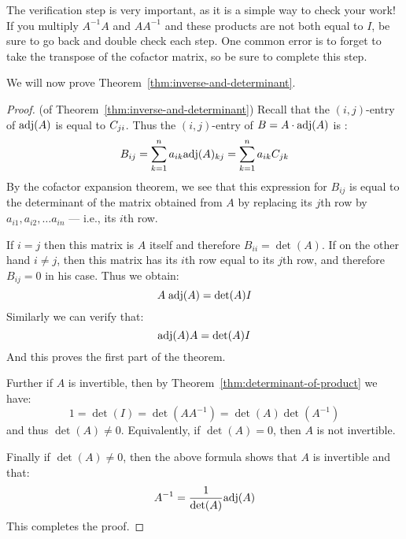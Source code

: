 The verification step is very important, as it is a simple way to
check your work! If you multiply $A^{-1}A$ and $AA^{-1}$ and these
products are not both equal to $I$, be sure to go back and double
check each step.  One common error is to forget to take the transpose
of the cofactor matrix, so be sure to complete this step.

We will now prove Theorem~\ref{thm:inverse-and-determinant}.

\begin{proof} (of Theorem~\ref{thm:inverse-and-determinant}) Recall
  that the $(i,j)$-entry of $\func{adj}(A)$ is equal to $\cof{A}{ji}$.
  Thus the $(i,j)$-entry of $B=A\cdot \func{adj}(A)$ is :
  \begin{equation*}
    B_{ij}=\sum_{k=1}^n a_{ik} \func{adj} (A)_{kj}= \sum_{k=1}^n a_{ik} \cof{A}{jk}
  \end{equation*}
  By the cofactor expansion theorem, we see that this expression for
  $B_{ij}$ is equal to the determinant of the matrix obtained from $A$
  by replacing its $j$th row by $a_{i1}, a_{i2}, \dots a_{in}$ ---
  i.e., its $i$th row.

  If $i=j$ then this matrix is $A$ itself and therefore
  $B_{ii}=\det(A)$. If on the other hand $i\neq j$, then this matrix
  has its $i$th row equal to its $j$th row, and therefore $B_{ij}=0$
  in his case. Thus we obtain:
  \begin{equation*}
    A \; \func{adj}(A) = {\det(A)} I
  \end{equation*}
  Similarly we can verify that:
  \begin{equation*}
    \func{adj}(A)A = {\det(A)} I
  \end{equation*}
  And this proves the first part of the theorem. 

  Further if $A$ is invertible, then by
  Theorem~\ref{thm:determinant-of-product} we have:
  \begin{equation*}
    1 = \det(I) = \det(A A^{-1}) = \det(A) \det(A^{-1})
  \end{equation*}
  and thus $\det(A) \neq 0$. Equivalently, if $\det(A) = 0$, then
  $A$ is not invertible.

  Finally if $\det(A) \neq 0$, then the above formula shows that $A$
  is invertible and that:
  \begin{equation*}
    A^{-1} = \frac{1}{\det(A)} \func{adj}(A)
  \end{equation*}
  This completes the proof.
\end{proof}


